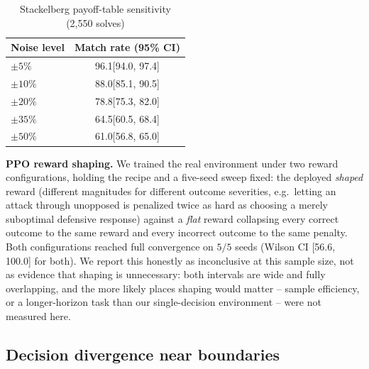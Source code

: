 \documentclass[conference]{IEEEtran}
\newcommand{\ci}[2]{[#1, #2]}
\begin{document}
\begin{table}[t]
\centering
\caption{Stackelberg payoff-table sensitivity (2{,}550 solves)}
\label{tab:stackelberg}
\small
\begin{tabular}{@{}lc@{}}
\toprule
\textbf{Noise level} & \textbf{Match rate (95\% CI)} \\
\midrule
$\pm5\%$  & 96.1\ci{94.0}{97.4} \\
$\pm10\%$ & 88.0\ci{85.1}{90.5} \\
$\pm20\%$ & 78.8\ci{75.3}{82.0} \\
$\pm35\%$ & 64.5\ci{60.5}{68.4} \\
$\pm50\%$ & 61.0\ci{56.8}{65.0} \\
\bottomrule
\end{tabular}
\end{table}

\textbf{PPO reward shaping.} We trained the real environment under two reward configurations,
holding the recipe and a five-seed sweep fixed: the deployed \emph{shaped} reward (different
magnitudes for different outcome severities, e.g.\ letting an attack through unopposed is
penalized twice as hard as choosing a merely suboptimal defensive response) against a \emph{flat}
reward collapsing every correct outcome to the same reward and every incorrect outcome to the same
penalty. Both configurations reached full convergence on $5/5$ seeds (Wilson CI \ci{56.6}{100.0}
for both). We report this honestly as inconclusive at this sample size, not as evidence that
shaping is unnecessary: both intervals are wide and fully overlapping, and the more likely places
shaping would matter -- sample efficiency, or a longer-horizon task than our single-decision
environment -- were not measured here.

\subsection{Decision divergence near boundaries}
\label{sec:divergence}
\end{document}
